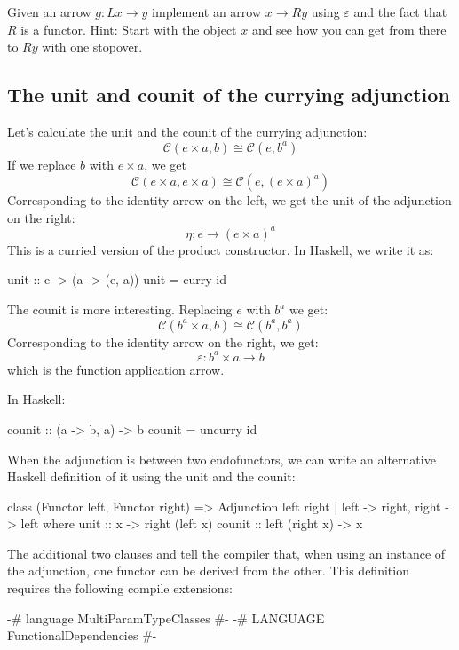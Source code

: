 \documentclass[DaoFP]{subfiles}
\begin{document}
\begin{exercise}
Given an arrow $g \colon L x \to y$ implement an arrow $x \to R y$ using $\varepsilon$ and the fact that $R$ is a functor. Hint: Start with the object $x$ and see how you can get from there to $R y$ with one stopover.
\end{exercise}

\subsection{The unit and counit of the currying adjunction}

Let's calculate the unit and the counit of the currying adjunction:
\[  \mathcal{C}(e \times a, b ) \cong  \mathcal{C} (e, b^a)  \]
If we replace $b$ with $e \times a$, we get
\[  \mathcal{C}(e \times a, e \times a ) \cong  \mathcal{C} (e, (e \times a)^a)  \]
Corresponding to the identity arrow on the left, we get the unit of the adjunction on the right:
\[ \eta \colon e \to (e \times a)^a \]
This is a curried version of the product constructor. In Haskell, we write it as:
\begin{haskell}
unit :: e -> (a -> (e, a))
unit = curry id
\end{haskell}

The counit is more interesting. Replacing $e$ with $b^a$ we get:
\[  \mathcal{C}(b^a \times a, b ) \cong  \mathcal{C} (b^a, b^a)  \]
Corresponding to the identity arrow on the right, we get:
\[ \varepsilon \colon b^a \times a \to b \]
which is the function application arrow. 

In Haskell:
\begin{haskell}
counit :: (a -> b, a) -> b
counit = uncurry id
\end{haskell}

When the adjunction is between two endofunctors, we can write an alternative Haskell definition of it using the unit and the counit:
\begin{haskell}
class (Functor left, Functor right) => 
  Adjunction left right | left -> right, right -> left where
    unit   :: x -> right (left x)
    counit :: left (right x) -> x
\end{haskell}
The additional two clauses  and  tell the compiler that, when using an instance of the adjunction, one functor can be derived from the other. This definition requires the following compile extensions:
\begin{haskell}
{-# language MultiParamTypeClasses #-}
{-# LANGUAGE FunctionalDependencies #-}
\end{haskell}
\end{document}

